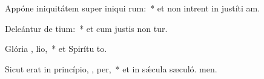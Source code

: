 \item Appóne iniquitátem super iniqui rum:~* et non intrent in justíti am.
\item Deleántur de  tium:~* et cum justis non tur.
\item Glória ,  lio,~* et Spirítu to.
\item Sicut erat in princípio,  ,  per,~* et in sǽcula sæculó. men.
